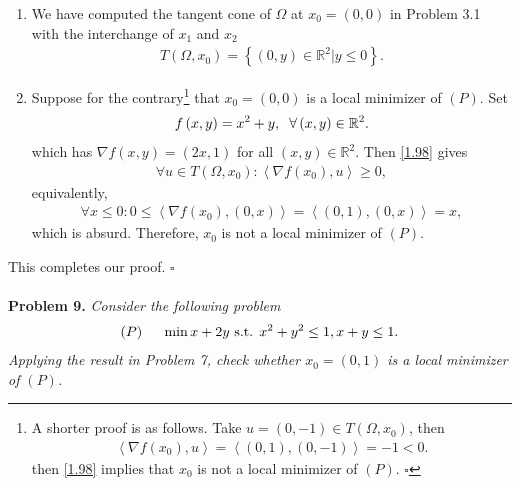 \documentclass[a4paper]{article}
\numberwithin{equation}{section}
\begin{document}
\begin{enumerate}
\item We have computed the tangent cone of $\Omega$ at $x_0=\left(0,0\right)$ in Problem 3.1 with the interchange of $x_1$ and $x_2$
\begin{align}
T\left( {\Omega ,{x_0}} \right) = \left\{ {\left( {0,y} \right) \in {\mathbb{R}^2}|y \le 0} \right\}.
\end{align}
\item Suppose for the contrary\footnote{A shorter proof is as follows. Take $u=\left(0,-1\right) \in T\left(\Omega,x_0\right)$, then
\begin{align}
\left\langle {\nabla f\left( {{x_0}} \right),u} \right\rangle  = \left\langle {\left( {0,1} \right),\left( {0, - 1} \right)} \right\rangle  =  - 1 < 0.
\end{align}
then \eqref{1.98} implies that $x_0$ is not a local minimizer of $\left(P\right)$. \hfill $\square$} that $x_0=\left(0,0\right)$ is a local minimizer of $\left(P\right)$. Set 
\begin{align}
f\left( {x,y} \right) = {x^2} + y,\hspace{0.2cm}\forall \left( {x,y} \right) \in {\mathbb{R} ^2}.
\end{align}
which has $\nabla f\left( {x,y} \right) = \left( {2x,1} \right)$ for all $\left( {x,y} \right) \in {\mathbb{R} ^2}$. Then \eqref{1.98} gives
\begin{align}
\forall u \in T\left( {\Omega ,{x_0}} \right):\left\langle {\nabla f\left( {{x_0}} \right),u} \right\rangle  \ge 0,
\end{align}
equivalently,
\begin{align}
\forall x \le 0:0 \le \left\langle {\nabla f\left( {{x_0}} \right),\left( {0,x} \right)} \right\rangle  = \left\langle {\left( {0,1} \right),\left( {0,x} \right)} \right\rangle  = x,
\end{align}
which is absurd. Therefore, $x_0$ is not a local minimizer of $\left(P\right)$. 
\end{enumerate}
This completes our proof. \hfill $\square$\\
\\
\textbf{Problem 9.} \textit{Consider the following problem}
\begin{align}
\left( P \right)\hspace{0.5cm}\min x + 2y \mbox{ s.t. } {x^2} + {y^2} \le 1,x + y \le 1.
\end{align}
\textit{Applying the result in Problem 7, check whether $x_0=\left(0,1\right)$ is a local minimizer of $\left(P\right)$.}\\
\end{document}
